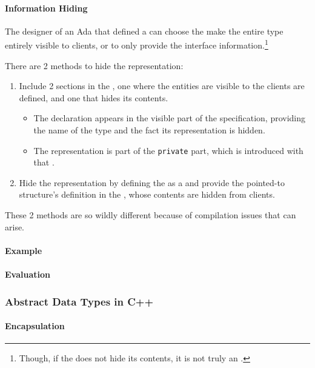 \paragraph{Information Hiding}\label{par:Ada_Info_Hiding}
The designer of an Ada  that defined a  can choose the make the entire type entirely visible to clients, or to only provide the interface information.\footnote{Though, if the  does not hide its contents, it is not truly an .}

There are 2 methods to hide the representation:
\begin{enumerate}[noitemsep]
\item Include 2 sections in the , one where the entities are visible to the clients are defined, and one that hides its contents.
  \begin{itemize}[noitemsep]
  \item The declaration appears in the visible part of the specification, providing the name of the type and the fact its representation is hidden.
  \item The representation is part of the \texttt{private} part, which is introduced with that .
  \end{itemize}
\item Hide the representation by defining the  as a  and provide the pointed-to structure's definition in the , whose contents are hidden from clients.
\end{enumerate}
These 2 methods are so wildly different because of compilation issues that can arise.

\paragraph{Example}\label{par:Ada_Abstract_Data_Type_Example}
\paragraph{Evaluation}\label{par:Ada_Abstract_Data_Type_Evaluation}

\subsubsection{Abstract Data Types in C++}\label{subsubsec:Abstract_Data_Types_C++}
\paragraph{Encapsulation}\label{par:C++_Encapsulation}
